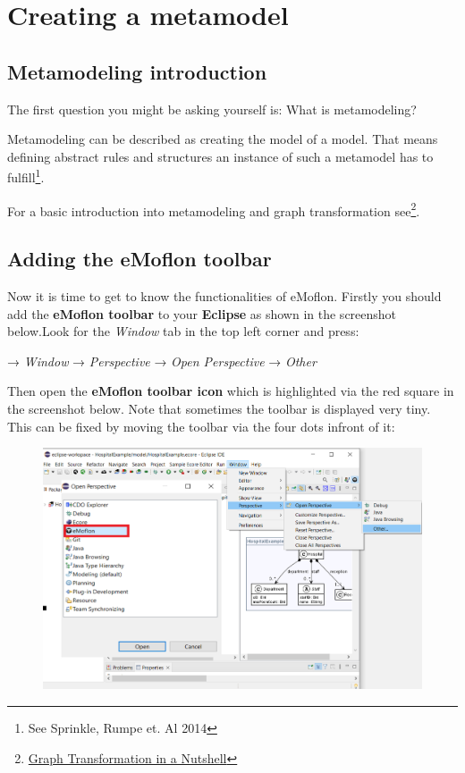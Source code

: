 \section{Creating a metamodel}
\subsection{Metamodeling introduction}

The first question you might be asking yourself is: What is metamodeling?

Metamodeling can be described as creating the model of a model. That means defining abstract rules and structures an instance of such a metamodel has to fulfill\footnote{See Sprinkle, Rumpe et. Al 2014 }.\newline

For a basic introduction into metamodeling and graph transformation see\footnote{\href{https://www.cs.le.ac.uk/people/rh122/papers/2006/Hec06Nutshell.pdf}{Graph Transformation in a Nutshell}}.

\subsection{Adding the eMoflon toolbar}

Now it is time to get to know the functionalities of eMoflon. Firstly you should add the \textbf{eMoflon toolbar} to your \textbf{Eclipse} as shown in the screenshot below.\newline Look for the \textit\textsf{Window} tab in the top left corner and press:\newline

\centering
→ \textit{\textsf{Window}} →
\textit{\textsf{Perspective}} → \textit{\textsf{Open Perspective}} → \textit{\textsf{Other}}
\newline

\raggedright
Then open the \textbf{eMoflon toolbar icon} which is highlighted via the red square in the screenshot below. Note that sometimes the toolbar is displayed very tiny. This can be fixed by moving the toolbar via the four dots infront of it:\newline\newline
\begin{figure}[h]
    \centering
    \includegraphics[scale=0.4, width =\textwidth]{pictures/add_perspective.png}
    \caption{}
    \label{add toolbar}
\end{figure}

